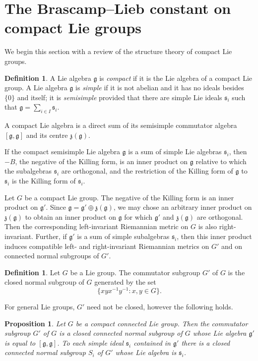 \documentclass[12pt,twoside,a4paper]{amsart}
\newtheorem{prop}[thm]{Proposition}%
\theoremstyle{definition}
\newtheorem{defn}[thm]{Definition}%
\theoremstyle{remark}
\numberwithin{equation}{section}
\newcommand{\Lie}[1]{\mathfrak{#1}}
\begin{document}
\section{The Brascamp--Lieb constant on compact Lie groups}
We begin this section with a review of the structure theory of compact Lie groups.

\begin{defn}
A Lie algebra $\Lie{g}$ is \emph{compact} if it is the Lie algebra of a compact Lie group.
A Lie algebra $\Lie{g}$ is \emph{simple} if it is not abelian and it has no ideals besides $\{0\}$ and itself; it is \emph{semisimple} provided that there are simple Lie ideals $\Lie{s}_i$ such that $\Lie{g}=\sum_{i\in I} \Lie{s}_i$.
\end{defn}

A compact Lie algebra is a direct sum of its semisimple commutator algebra $[\Lie{g}, \Lie{g}]$ and its centre $\Lie{z}(\Lie{g})$.

If the compact semisimple Lie algebra $\Lie{g}$ is a sum of simple Lie algebras $\Lie{s}_i$, then $-B$, the negative of the Killing form, is an inner product on $\Lie{g}$ relative to which the subalgebras $\Lie{s}_i$ are orthogonal, and the restriction of the Killing form of $\Lie{g}$ to $\Lie{s}_i$ is the Killing form of $\Lie{s}_i$.


Let $G$ be a compact Lie group.
The negative of the Killing form is an inner product on $\Lie{g}'$.
Since $\Lie{g} = \Lie{g}' \oplus \Lie{z}(\Lie{g})$, we may chose an arbitrary inner product on $\Lie{z}(\Lie{g})$ to obtain an inner product on $\Lie{g}$ for which $\Lie{g}'$ and $\Lie{z}(\Lie{g})$ are orthogonal.
Then the corresponding left-invariant Riemannian metric on $G$ is also right-invariant.
Further, if $\Lie{g}'$ is a sum of simple subalgebras $\Lie{s}_i$, then this inner product induces compatible left- and right-invariant Riemannian metrics on $G'$ and on connected normal subgroups of $G'$.  


\begin{defn}
Let $G$ be a Lie group.
The commutator subgroup $G'$ of $G$ is the closed normal subgroup of $G$ generated by the set
\[
\{xyx^{-1}y^{-1} : x,y \in G\}.\]
\end{defn} 

For general Lie groups, $G'$ need not be closed, however the following holds.

\begin{prop}
Let $G$ be a compact connected Lie group.
Then the commutator subgroup $G'$ of $G$ is a closed  connected normal sub\-group of $G$ whose Lie algebra $\Lie{g}'$ is equal to $[\Lie{g},\Lie{g}]$.
To each simple ideal $\Lie{s}_i$ contained in $\Lie{g}'$ there is a closed  connected normal sub\-group $S_i$ of $G'$ whose Lie algebra is $\Lie{s}_i$.
\end{prop}
\end{document}
